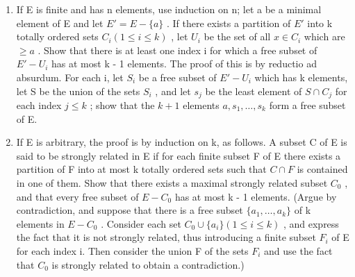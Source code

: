 \begin{enumerate}
\def\labelenumi{(\alph{enumi})}
\item
  If E is finite and has n elements, use induction on n; let a be a minimal element of E and let \(E' = E - \{a\}\) . If there exists a partition of \(E'\) into k totally ordered sets \(C_i (1 \leqslant i \leqslant k)\) , let \(U_i\) be the set of all \(x \in C_i\) which are \(\geqslant a\) . Show that there is at least one index i for which a free subset of \(E' - U_i\) has at most k - 1 elements. The proof of this is by reductio ad absurdum. For each i, let \(S_i\) be a free subset of \(E' - U_i\) which has k elements, let S be the union of the sets \(S_i\) , and let \(s_j\) be the least element of \(S \cap C_j\) for each index \(j \leqslant k\) ; show that the \(k + 1\) elements \(a, s_1, \ldots, s_k\) form a free subset of E.
\item
  If E is arbitrary, the proof is by induction on k, as follows. A subset C of E is said to be strongly related in E if for each finite subset F of E there exists a partition of F into at most k totally ordered sets such that \(C \cap F\) is contained in one of them. Show that there exists a maximal strongly related subset \(C_{0}\) , and that every free subset of \(E - C_{0}\) has at most k - 1 elements. (Argue by contradiction, and suppose that there is a free subset \(\{a_{1}, \ldots, a_{k}\}\) of k elements in \(E - C_{0}\) . Consider each set \(C_{0} \cup \{a_{i}\} (1 \leqslant i \leqslant k)\) , and express the fact that it is not strongly related, thus introducing a finite subset \(F_{i}\) of E for each index i. Then consider the union F of the sets \(F_{i}\) and use the fact that \(C_{0}\) is strongly related to obtain a contradiction.)
\end{enumerate}

